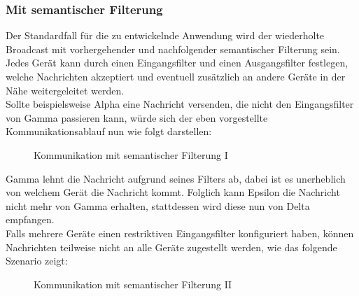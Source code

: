\subsubsection{Mit semantischer Filterung}
Der Standardfall für die zu entwickelnde Anwendung wird der wiederholte Broadcast mit vorhergehender und nachfolgender semantischer Filterung sein. Jedes Gerät kann durch einen Eingangsfilter und einen Ausgangsfilter festlegen, welche Nachrichten akzeptiert und eventuell zusätzlich an andere Geräte in der Nähe weitergeleitet werden. 
\\Sollte beispielsweise Alpha eine Nachricht versenden, die nicht den Eingangsfilter von Gamma passieren kann, würde sich der eben vorgestellte Kommunikationsablauf nun wie folgt darstellen:
\begin{figure}[H]
	\centering
	\caption{Kommunikation mit semantischer Filterung I}
	\label{fig:beispielszenario2}
\end{figure}
Gamma lehnt die Nachricht aufgrund seines Filters ab, dabei ist es unerheblich von welchem Gerät die Nachricht kommt. Folglich kann Epsilon die Nachricht nicht mehr von Gamma erhalten, stattdessen wird diese nun von Delta empfangen. 
\\Falls mehrere Geräte einen restriktiven Eingangsfilter konfiguriert haben, können Nachrichten teilweise nicht an alle Geräte zugestellt werden, wie das folgende Szenario zeigt:\\
\begin{figure}[H]
	\centering
	\caption{Kommunikation mit semantischer Filterung II}
	\label{fig:beispielszenario3}
\end{figure}
